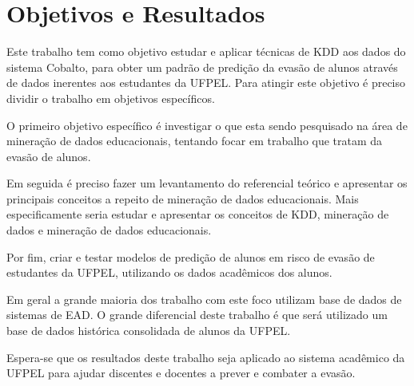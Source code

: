 \documentclass[diss-proposta,nocipinfo]{texufpel}
\begin{document}



\chapter{Objetivos e Resultados}

Este trabalho tem como objetivo estudar e aplicar técnicas de KDD aos dados do sistema Cobalto, para obter um padrão de predição da evasão de alunos através de dados inerentes aos estudantes da UFPEL. Para atingir este objetivo é preciso dividir o trabalho em objetivos específicos.

O primeiro objetivo específico é investigar o que esta sendo pesquisado na área de mineração de dados educacionais, tentando focar em trabalho que tratam da evasão de alunos.

Em seguida é preciso fazer um levantamento do referencial teórico e apresentar os principais conceitos a repeito de mineração de dados educacionais. Mais especificamente seria estudar e apresentar os conceitos de KDD, mineração de dados e mineração de dados educacionais.

Por fim, criar e testar modelos de predição de alunos em risco de evasão de estudantes da UFPEL, utilizando os dados acadêmicos dos alunos.

Em geral a grande maioria dos trabalho com este foco utilizam base de dados de sistemas de EAD. O grande diferencial deste trabalho é que será utilizado um base de dados histórica consolidada de alunos da UFPEL.

Espera-se que os resultados deste trabalho seja aplicado ao sistema acadêmico da UFPEL para ajudar discentes e docentes a prever e combater a evasão.

\end{document}
